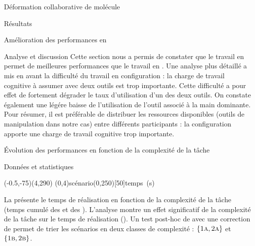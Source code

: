 \documentclass[myfrancais,ngerman,english,frenchb]{mythesis}
\begin{document}
\begin{mychapter}{Déformation collaborative de molécule}
\begin{mysection}{Résultats}
\begin{mysubsection}{Amélioration des performances en }
\begin{mysubsubsection}{Analyse et discussion}
					Cette section nous a permis de constater que le travail en  permet de meilleures performances que le travail en .
					Une analyse plus détaillé a mis en avant la difficulté du travail en configuration  : la charge de travail cognitive à assumer avec deux outils est trop importante.
					Cette difficulté a pour effet de fortement dégrader le taux d'utilisation d'un des deux outils.
					On constate également une légére baisse de l'utilisation de l'outil associé à la main dominante.
					Pour résumer, il est préférable de distribuer les ressources disponibles (outils de manipulation dans notre cas) entre différents participants : la configuration  apporte une charge de travail cognitive trop importante.
				\end{mysubsubsection}
			\end{mysubsection}
			\begin{mysubsection}{Évolution des performances en fonction de la complexité de la tâche}
				\begin{mysubsubsection}{Données et statistiques}
					\begin{myfigure}
						\begin{myps}(-0.5,-75)(4,290)
							\myaxes(0,4){scénario}(0,250)[50]{temps~(s)}
						\end{myps}
					\end{myfigure}

					La  présente le temps de réalisation  en fonction de la complexité de la tâche  (temps cumulé des  et des ).
					L'analyse montre un effet significatif de la complexité de la tâche  sur le temps de réalisation  ().
					Un test post-hoc de  avec une correction de  permet de trier les scénarios en deux classes de complexité : $\left\{\textsc{1a}, \textsc{2a}\right\}$ et $\left\{\textsc{1b}, \textsc{2b}\right\}$.


\end{mysubsubsection}
\end{mysubsection}
\end{mysection}
\end{mychapter}
\end{document}
